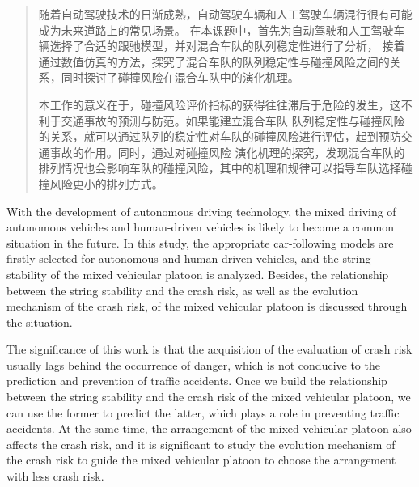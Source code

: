 

\begin{abstract}
随着自动驾驶技术的日渐成熟，自动驾驶车辆和人工驾驶车辆混行很有可能成为未来道路上的常见场景。
在本课题中，首先为自动驾驶和人工驾驶车辆选择了合适的跟驰模型，并对混合车队的队列稳定性进行了分析，
接着通过数值仿真的方法，探究了混合车队的队列稳定性与碰撞风险之间的关系，同时探讨了碰撞风险在混合车队中的演化机理。

本工作的意义在于，碰撞风险评价指标的获得往往滞后于危险的发生，这不利于交通事故的预测与防范。如果能建立混合车队
队列稳定性与碰撞风险的关系，就可以通过队列的稳定性对车队的碰撞风险进行评估，起到预防交通事故的作用。同时，通过对碰撞风险
演化机理的探究，发现混合车队的排列情况也会影响车队的碰撞风险，其中的机理和规律可以指导车队选择碰撞风险更小的排列方式。


\end{abstract}

\begin{abstract*}
  
With the development of autonomous driving technology, 
the mixed driving of autonomous vehicles and human-driven vehicles is likely to become a common situation in the future.
In this study, the appropriate car-following models are firstly selected for autonomous and human-driven vehicles,
and the string stability of the mixed vehicular platoon is analyzed.
Besides, the relationship between the string stability and the crash risk, 
as well as the evolution mechanism of the crash risk,  of the mixed vehicular platoon is discussed 
through the situation. 

The significance of this work is that the acquisition of the evaluation of crash risk usually lags behind the
occurrence of danger, which is not conducive to the prediction and prevention of traffic accidents.
Once we build the relationship between the string stability and the crash risk of the mixed vehicular platoon,
we can use the former to predict the latter,
which plays a role in preventing traffic accidents. 
At the same time, the arrangement of the mixed vehicular platoon also affects the crash risk,
and it is significant to study the evolution mechanism of the crash risk 
to guide the mixed vehicular platoon to choose the arrangement with less crash risk.

\end{abstract*}